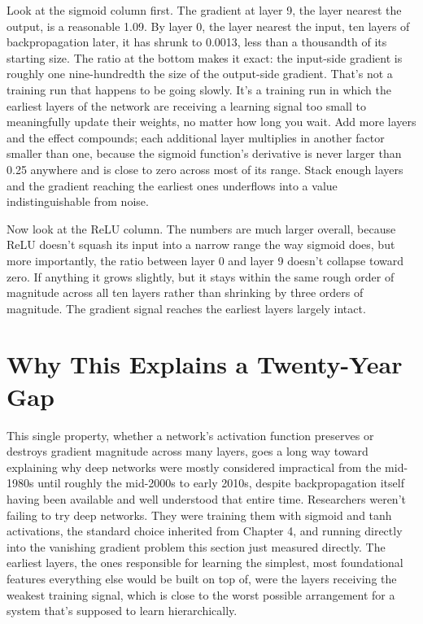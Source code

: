 Look at the sigmoid column first. The gradient at layer 9, the layer nearest the output, is a reasonable 1.09. By layer 0, the layer nearest the input, ten layers of backpropagation later, it has shrunk to 0.0013, less than a thousandth of its starting size. The ratio at the bottom makes it exact: the input-side gradient is roughly one nine-hundredth the size of the output-side gradient. That's not a training run that happens to be going slowly. It's a training run in which the earliest layers of the network are receiving a learning signal too small to meaningfully update their weights, no matter how long you wait. Add more layers and the effect compounds; each additional layer multiplies in another factor smaller than one, because the sigmoid function's derivative is never larger than 0.25 anywhere and is close to zero across most of its range. Stack enough layers and the gradient reaching the earliest ones underflows into a value indistinguishable from noise.

Now look at the ReLU column. The numbers are much larger overall, because ReLU doesn't squash its input into a narrow range the way sigmoid does, but more importantly, the ratio between layer 0 and layer 9 doesn't collapse toward zero. If anything it grows slightly, but it stays within the same rough order of magnitude across all ten layers rather than shrinking by three orders of magnitude. The gradient signal reaches the earliest layers largely intact.

\section*{Why This Explains a Twenty-Year Gap}

This single property, whether a network's activation function preserves or destroys gradient magnitude across many layers, goes a long way toward explaining why deep networks were mostly considered impractical from the mid-1980s until roughly the mid-2000s to early 2010s, despite backpropagation itself having been available and well understood that entire time. Researchers weren't failing to try deep networks. They were training them with sigmoid and tanh activations, the standard choice inherited from Chapter 4, and running directly into the vanishing gradient problem this section just measured directly. The earliest layers, the ones responsible for learning the simplest, most foundational features everything else would be built on top of, were the layers receiving the weakest training signal, which is close to the worst possible arrangement for a system that's supposed to learn hierarchically.

